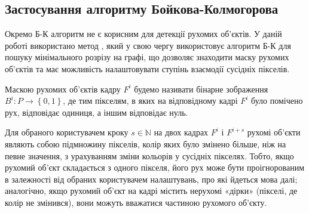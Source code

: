 \subsection{Застосування алгоритму Бойкова-Колмогорова}

Окремо Б-К алгоритм не є корисним для детекції рухомих об'єктів. У даній роботі
використано метод \cite{pavliuk_krygin}, який у свою чергу використовує алгоритм Б-К
для пошуку мінімального розрізу на графі, що дозволяє знаходити
маску рухомих об'єктів та має можливість налаштовувати ступінь взаємодії сусідніх
пікселів.
\begin{definition}
	Маскою рухомих об'єктів кадру \(F^{i}\) будемо називати бінарне
	зображення \(B^{i}:P \rightarrow \left\{ 0,1 \right\}\), де тим
	пікселям, в яких на відповідному кадрі \(F^{i}\) було помічено рух,
	відповідає одиниця, а іншим відповідає нуль.
\end{definition}

Для обраного користувачем
кроку $s \in \mathbb{N}$ на двох кадрах \(F^{i}\) і \(F^{i + s}\) рухомі об'єкти
являють собою підмножину пікселів, колір яких було змінено більше, ніж
на певне значення, з урахуванням зміни кольорів у сусідніх пікселях.
Тобто, якщо рухомий об'єкт складається з одного пікселя, його рух може
бути проігнорованим в залежності від обраних користувачем налаштувань,
про які йдеться мова далі; аналогічно, якщо рухомий об'єкт на кадрі
містить нерухомі «дірки» (пікселі, де колір не змінився), вони можуть
вважатися частиною рухомого об'єкту.

